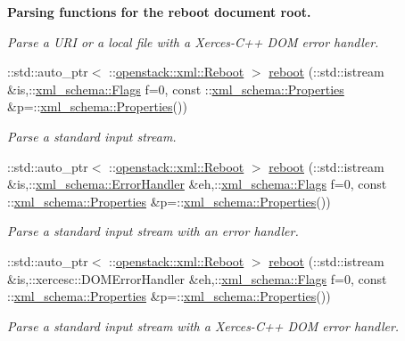 \begin{Indent}{\bf Parsing functions for the reboot document root.}
\begin{DoxyCompactItemize}
\begin{DoxyCompactList}\small\item\em Parse a URI or a local file with a Xerces-\/C++ DOM error handler. \item\end{DoxyCompactList}\item 
::std::auto\_\-ptr$<$ ::\hyperlink{classopenstack_1_1xml_1_1Reboot}{openstack::xml::Reboot} $>$ \hyperlink{namespaceopenstack_1_1xml_ae556a16898d50acfc3ab2d1df2220717}{reboot} (::std::istream \&is,::\hyperlink{namespacexml__schema_affb4c227cbd9aa7453dd1dc5a1401943}{xml\_\-schema::Flags} f=0, const ::\hyperlink{namespacexml__schema_ad27ce19a7ee1d3b1064092648898f64c}{xml\_\-schema::Properties} \&p=::\hyperlink{namespacexml__schema_ad27ce19a7ee1d3b1064092648898f64c}{xml\_\-schema::Properties}())
\begin{DoxyCompactList}\small\item\em Parse a standard input stream. \item\end{DoxyCompactList}\item 
::std::auto\_\-ptr$<$ ::\hyperlink{classopenstack_1_1xml_1_1Reboot}{openstack::xml::Reboot} $>$ \hyperlink{namespaceopenstack_1_1xml_ab8fb5e49407bcc66c97be9049d5a9744}{reboot} (::std::istream \&is,::\hyperlink{namespacexml__schema_ab1c9361bfd3b404eaabf0c31eded79dc}{xml\_\-schema::ErrorHandler} \&eh,::\hyperlink{namespacexml__schema_affb4c227cbd9aa7453dd1dc5a1401943}{xml\_\-schema::Flags} f=0, const ::\hyperlink{namespacexml__schema_ad27ce19a7ee1d3b1064092648898f64c}{xml\_\-schema::Properties} \&p=::\hyperlink{namespacexml__schema_ad27ce19a7ee1d3b1064092648898f64c}{xml\_\-schema::Properties}())
\begin{DoxyCompactList}\small\item\em Parse a standard input stream with an error handler. \item\end{DoxyCompactList}\item 
::std::auto\_\-ptr$<$ ::\hyperlink{classopenstack_1_1xml_1_1Reboot}{openstack::xml::Reboot} $>$ \hyperlink{namespaceopenstack_1_1xml_aec61b8919cfafd464270f843d5e1f8e6}{reboot} (::std::istream \&is,::xercesc::DOMErrorHandler \&eh,::\hyperlink{namespacexml__schema_affb4c227cbd9aa7453dd1dc5a1401943}{xml\_\-schema::Flags} f=0, const ::\hyperlink{namespacexml__schema_ad27ce19a7ee1d3b1064092648898f64c}{xml\_\-schema::Properties} \&p=::\hyperlink{namespacexml__schema_ad27ce19a7ee1d3b1064092648898f64c}{xml\_\-schema::Properties}())
\begin{DoxyCompactList}\small\item\em Parse a standard input stream with a Xerces-\/C++ DOM error handler. \item\end{DoxyCompactList}\item 

\end{DoxyCompactItemize}
\end{Indent}
